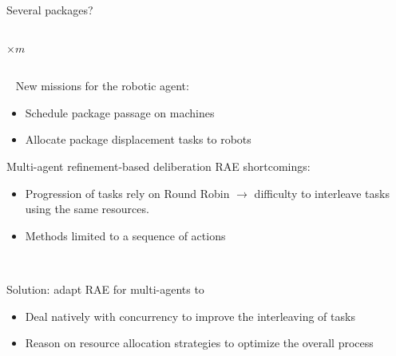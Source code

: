 \begin{frame}{Several packages?}
\begin{columns}
\begin{column}{0.5\textwidth}
            \LARGE $\times m$
        \end{column}
    \end{columns}
    
    ~
\pause
    New missions for the robotic agent:
    \begin{itemize}
        \pause
        \item Schedule package passage on machines
        \pause
        \item Allocate package displacement tasks to robots
    \end{itemize}

    \centering
\end{frame}

\begin{frame}{Multi-agent refinement-based deliberation}
    RAE shortcomings:
    \begin{itemize}
        \pause
        \item Progression of tasks rely on Round Robin \pause$\rightarrow$ difficulty to interleave tasks using the same resources.
        \pause
        \item Methods limited to a sequence of actions
    \end{itemize}

    ~~
    
\pause
    Solution: adapt RAE for multi-agents to
    \begin{itemize}
        \pause
        \item Deal natively with concurrency to improve the interleaving of tasks
        \pause
        \item Reason on resource allocation strategies to optimize the overall process
    \end{itemize}

\end{frame}
